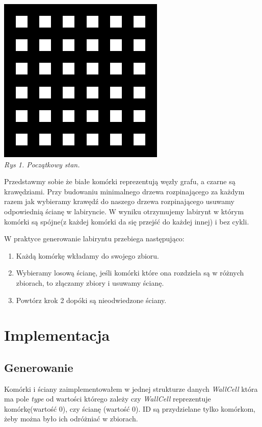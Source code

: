 \documentclass[12pt]{report}
\begin{document}
\begin{center}
	\includegraphics[scale=0.6]{./pic/grid.png}
	\\\textit{\footnotesize{ Rys 1. 
			Początkowy stan.}}
	\label{ris:image1}
\end{center}

\par Przedstawmy sobie że białe komórki reprezentują węzły grafu, a
 czarne są krawędziami. Przy budowaniu minimalnego drzewa rozpinającego 
za każdym razem jak wybieramy krawędź do naszego drzewa rozpinającego 
usuwamy odpowiednią ścianę w labiryncie. W wyniku otrzymujemy 
labirynt w którym komórki są spójne(z każdej komórki da się przejść 
do każdej innej) i bez cykli.
\par W praktyce generowanie labiryntu przebiega następująco:
\begin{enumerate}
\item Każdą komórkę wkładamy do swojego zbioru.
\item Wybieramy losową ścianę, jeśli komórki które ona rozdziela są w
różnych zbiorach, to złączamy zbiory i usuwamy ścianę.
\item Powtórz krok 2 dopóki są nieodwiedzone ściany.
\end{enumerate}

\newpage

\section{Implementacja}
\subsection{Generowanie}
\par Komórki i ściany zaimplementowałem w jednej strukturze danych 
\textit{WallCell} która ma pole \textit{type} od wartości którego zależy
czy \textit{WallCell} reprezentuje komórkę(wartość 0), czy ścianę
(wartość 0). ID są przydzielane tylko komórkom, żeby można było ich
odróżniać w zbiorach.
\end{document}
